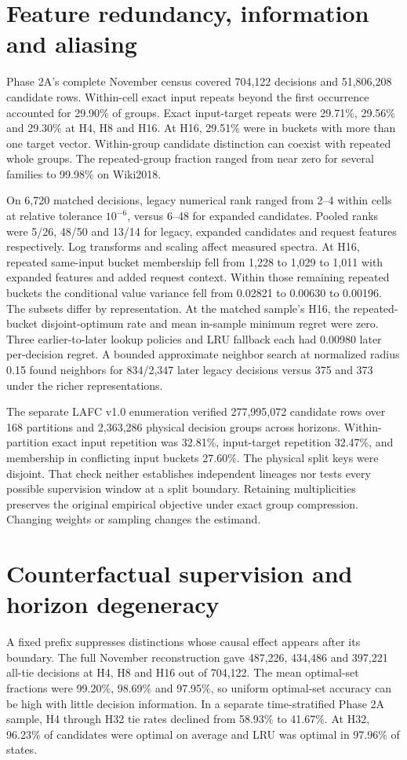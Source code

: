 \documentclass[11pt,letterpaper]{article}
\begin{document}
\section{Feature redundancy, information and aliasing}
Phase 2A's complete November census covered 704,122 decisions and 51,806,208 candidate rows. Within-cell exact input repeats beyond the first occurrence accounted for 29.90\% of groups. Exact input-target repeats were 29.71\%, 29.56\% and 29.30\% at H4, H8 and H16. At H16, 29.51\% were in buckets with more than one target vector. Within-group candidate distinction can coexist with repeated whole groups. The repeated-group fraction ranged from near zero for several families to 99.98\% on Wiki2018.

On 6,720 matched decisions, legacy numerical rank ranged from 2--4 within cells at relative tolerance \(10^{-6}\), versus 6--48 for expanded candidates. Pooled ranks were 5/26, 48/50 and 13/14 for legacy, expanded candidates and request features respectively. Log transforms and scaling affect measured spectra. At H16, repeated same-input bucket membership fell from 1,228 to 1,029 to 1,011 with expanded features and added request context. Within those remaining repeated buckets the conditional value variance fell from 0.02821 to 0.00630 to 0.00196. The subsets differ by representation. At the matched sample's H16, the repeated-bucket disjoint-optimum rate and mean in-sample minimum regret were zero. Three earlier-to-later lookup policies and LRU fallback each had 0.00980 later per-decision regret. A bounded approximate neighbor search at normalized radius 0.15 found neighbors for 834/2,347 later legacy decisions versus 375 and 373 under the richer representations.

The separate LAFC v1.0 enumeration verified 277,995,072 candidate rows over 168 partitions and 2,363,286 physical decision groups across horizons. Within-partition exact input repetition was 32.81\%, input-target repetition 32.47\%, and membership in conflicting input buckets 27.60\%. The physical split keys were disjoint. That check neither establishes independent lineages nor tests every possible supervision window at a split boundary. Retaining multiplicities preserves the original empirical objective under exact group compression. Changing weights or sampling changes the estimand.

\section{Counterfactual supervision and horizon degeneracy}
A fixed prefix suppresses distinctions whose causal effect appears after its boundary. The full November reconstruction gave 487,226, 434,486 and 397,221 all-tie decisions at H4, H8 and H16 out of 704,122. The mean optimal-set fractions were 99.20\%, 98.69\% and 97.95\%, so uniform optimal-set accuracy can be high with little decision information. In a separate time-stratified Phase 2A sample, H4 through H32 tie rates declined from 58.93\% to 41.67\%. At H32, 96.23\% of candidates were optimal on average and LRU was optimal in 97.96\% of states.
\end{document}
